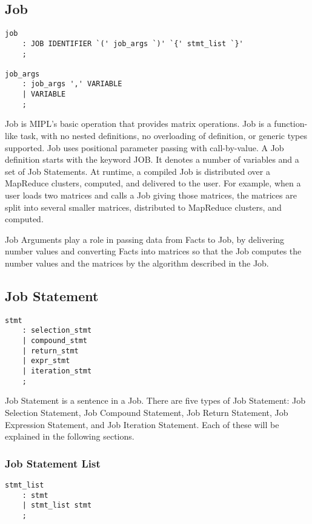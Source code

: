 \documentclass[prodmode,acmtecs]{acmsmall}
\begin{document}
\subsection{Job}

\begin{lstlisting}
job
	: JOB IDENTIFIER `(' job_args `)' `{' stmt_list `}'
	;

job_args
	: job_args ',' VARIABLE
	| VARIABLE
	;
\end{lstlisting}

\label{Job_Section}
Job is MIPL's basic operation that provides matrix operations.
Job is a function-like task, with no nested definitions, no
overloading of definition, or generic types supported. Job uses
positional parameter passing with call-by-value.  A Job
definition starts with the keyword JOB. It denotes a number of variables and a set of Job
Statements.  At runtime, a compiled Job is distributed over
a MapReduce clusters, computed, and delivered to the user. For
example, when a user loads two matrices and calls a Job giving those
matrices, the matrices are split into several smaller matrices,
distributed to MapReduce clusters, and computed.

Job Arguments play a role in passing data from Facts to Job, by
delivering number values and converting Facts into matrices
so that the Job computes the number values and the matrices by
the algorithm described in the Job.
\medskip

\subsection{Job Statement}

\begin{lstlisting}
stmt
	: selection_stmt
	| compound_stmt
	| return_stmt
	| expr_stmt
	| iteration_stmt
	;
\end{lstlisting}

Job Statement is a sentence in a Job.  There are five types of
Job Statement: Job Selection Statement, Job Compound Statement,
Job Return Statement, Job Expression Statement, and Job Iteration
Statement.  Each of these will be explained in the following
sections.
\medskip

\subsubsection{Job Statement List}

\begin{lstlisting}
stmt_list
	: stmt
	| stmt_list stmt
	;
\end{lstlisting}
\end{document}
